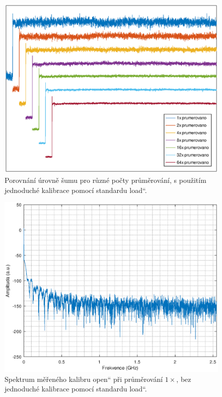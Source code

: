 \begin{figure}[htbp]
\includegraphics[width=\textwidth,keepaspectratio]{images/noise_cal_comparison.eps}\caption{Porovnání úrovně šumu pro různé počty průměrování, s použitím jednoduché kalibrace pomocí standardu \quotedblbase load\textquotedblleft .}\label{noise_cal_comparison}
\end{figure}

\begin{figure}[htbp]
\includegraphics[width=\textwidth,keepaspectratio]{images/noise_raw_avg1.eps}\caption{Spektrum měřeného kalibru \quotedblbase open\textquotedblleft{} při průměrování $1\times$, bez jednoduché kalibrace pomocí standardu \quotedblbase load\textquotedblleft .}\label{noise_raw_avg1}
\end{figure}

